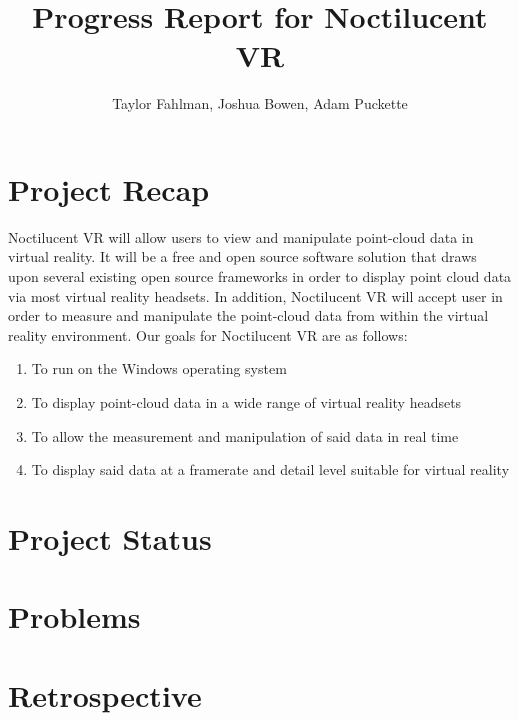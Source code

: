 \documentclass{article}
\begin{document}
\title {Progress Report for Noctilucent VR}
\author {Taylor Fahlman, Joshua Bowen, Adam Puckette}

\maketitle

\section{Project Recap}

Noctilucent VR will allow users to view and manipulate point-cloud data in virtual reality. 
It will be a free and open source software solution that draws upon several existing open source frameworks in order to display point cloud data via most virtual reality headsets. 
In addition, Noctilucent VR will accept user in order to measure and manipulate the point-cloud data from within the virtual reality environment. 
Our goals for Noctilucent VR are as follows:

\begin{enumerate}
\item To run on the Windows operating system
\item To display point-cloud data in a wide range of virtual reality headsets
\item To allow the measurement and manipulation of said data in real time
\item To display said data at a framerate and detail level suitable for virtual reality
\end{enumerate}

\section{Project Status}

\section{Problems}

\section{Retrospective}
\end{document}
